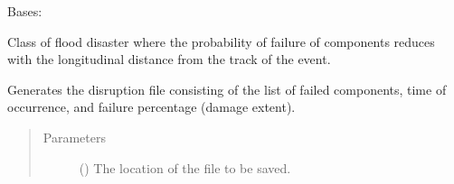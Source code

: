 \documentclass[letterpaper,10pt,english]{sphinxmanual}
\begin{document}

\begin{fulllineitems}
\label{\detokenize{apidoc:dreaminsg_integrated_model.src.hazard_initiator.TrackDisruption}}
\sphinxAtStartPar
Bases: 

\sphinxAtStartPar
Class of flood disaster where the probability of failure of components reduces with the longitudinal distance from the track of the event.

\begin{fulllineitems}
\label{\detokenize{apidoc:dreaminsg_integrated_model.src.hazard_initiator.TrackDisruption.generate_disruption_file}}
\sphinxAtStartPar
Generates the disruption file consisting of the list of failed components, time of occurrence, and failure percentage (damage extent).
\begin{quote}\begin{description}
\item[{Parameters}] \leavevmode
\sphinxAtStartPar
{} () \textendash{} The location of the file to be saved.

\end{description}\end{quote}

\end{fulllineitems}



\end{fulllineitems}
\end{document}
